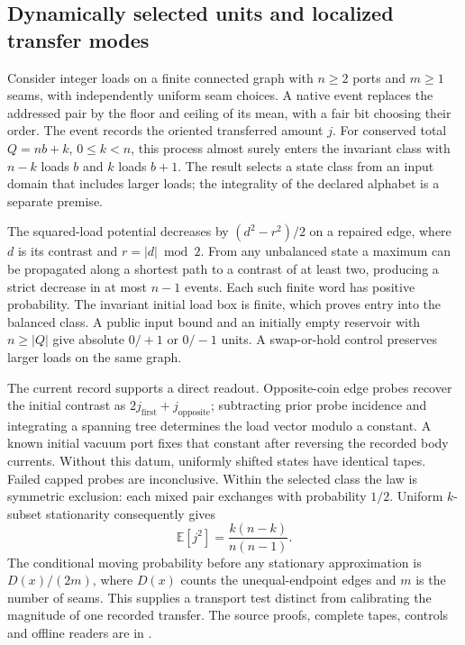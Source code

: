 \subsection{Dynamically selected units and localized transfer modes}
\label{subsec:dynamic-unit-selection-local-modes}

Consider integer loads on a finite connected graph with $n\geq2$ ports and
$m\geq1$ seams, with independently uniform seam choices. A native event replaces
the addressed pair by the floor and ceiling of its mean, with a fair bit
choosing their order. The event records the oriented transferred amount $j$.
For conserved total $Q=nb+k$, $0\leq k<n$, this process almost surely enters
the invariant class with $n-k$ loads $b$ and $k$ loads $b+1$. The result
selects a state class from an input domain that includes larger loads; the
integrality of the declared alphabet is a separate premise.

The squared-load potential decreases by $(d^2-r^2)/2$ on a repaired edge,
where $d$ is its contrast and $r=|d|\bmod2$. From any unbalanced state a
maximum can be propagated along a shortest path to a contrast of at least
two, producing a strict decrease in at most $n-1$ events. Each such finite
word has positive probability. The invariant initial load box is finite,
which proves entry into the balanced class. A public input bound and an
initially empty reservoir with $n\geq |Q|$ give absolute $0/+1$ or $0/-1$
units. A swap-or-hold control preserves larger loads on the same graph.

The current record supports a direct readout. Opposite-coin edge probes
recover the initial contrast as $2j_{\mathrm{first}}+j_{\mathrm{opposite}}$;
subtracting prior probe incidence and integrating a spanning tree determines
the load vector modulo a constant. A known initial vacuum port fixes that
constant after reversing the recorded body currents. Without this datum,
uniformly shifted states have identical tapes. Failed capped probes are
inconclusive. Within the selected class the law is symmetric exclusion:
each mixed pair exchanges with probability $1/2$. Uniform $k$-subset
stationarity consequently gives
\[
  \mathbb E[j^2]=\frac{k(n-k)}{n(n-1)}.
\]
The conditional moving probability before any stationary approximation is
$D(x)/(2m)$, where $D(x)$ counts the unequal-endpoint edges and $m$ is the
number of seams. This supplies a transport test distinct from calibrating
the magnitude of one recorded transfer. The source proofs, complete tapes,
controls and offline readers are in .


